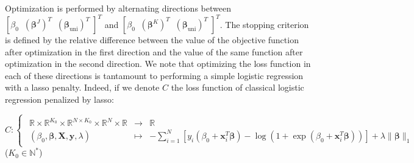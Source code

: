 \documentclass[10pt]{article}
\begin{document}
\noindent Optimization is performed by alternating directions between $\left[ \beta_0 \; \; \left(\bm{\beta}^J \right)^T \; \; \left( \bm{\beta}_{\text{uni}} \right)^T \; \right]^T$ and  $\left[ \beta_0 \; \; \left(\bm{\beta}^K \right)^T \; \; \left( \bm{\beta}_{\text{uni}} \right)^T \; \right]^T$. The stopping criterion is defined by the relative difference between the value of the objective function after optimization in the first direction and the value of the same function after optimization in the second direction.  We note that optimizing the loss function in each of these directions is tantamount to performing a simple logistic regression with a lasso penalty. Indeed, if we denote $C$ the loss function of classical logistic regression penalized by lasso: 

\begin{equation}
C: \begin{cases} 
    \begin{array}{ccl}
    \mathbb{R} \times \mathbb{R}^{K_0} \times \mathbb{R}^{N \times K_0} \times \mathbb{R}^{N} \times \mathbb{R} & \longrightarrow & \mathbb{R} \\
    (\beta_0, \bm{\beta}, \mathbf{X}, \mathbf{y}, \lambda ) & \longmapsto & -\displaystyle{\sum\limits_{i = 1}^N} [ y_i(\beta_0 + \mathbf{x}_i^T \bm{\beta}) - \log(1 + \exp(\beta_0 + \mathbf{x}_i^T \bm{\beta})) ] + \lambda \lVert \bm{\beta} \rVert_1
     \end{array}
\end{cases}
\end{equation}
($K_0 \in \mathbb{N}^{*}$)
\end{document}
